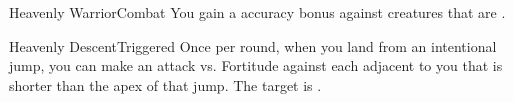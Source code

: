 \begin{feat}{Heavenly Warrior}{Combat}
     You gain a  accuracy bonus against creatures that are .

    \begin{triggeredability}{Heavenly Descent}{Triggered}
      Once per round, when you land from an intentional jump, you can make an attack vs. Fortitude against each  adjacent to you that is shorter than the apex of that jump.
      \hit The target is  \stunned.
    \end{triggeredability}
  \end{feat}






